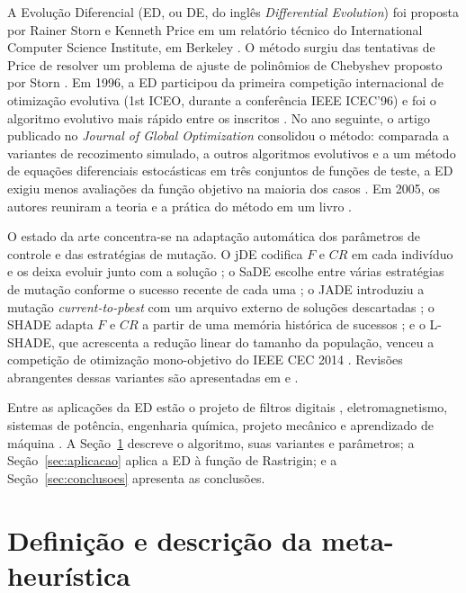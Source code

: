 \documentclass[12pt]{article}
\begin{document}
A Evolução Diferencial (ED, ou DE, do inglês \emph{Differential Evolution}) foi
proposta por Rainer Storn e Kenneth Price em um relatório técnico do
International Computer Science Institute, em Berkeley \cite{storn1995}. O
método surgiu das tentativas de Price de resolver um problema de ajuste de
polinômios de Chebyshev proposto por Storn \cite{das2011}. Em 1996, a ED
participou da primeira competição internacional de otimização evolutiva
(1st ICEO, durante a conferência IEEE ICEC'96) e foi o algoritmo evolutivo mais
rápido entre os inscritos
\cite{price1996iceo}. No ano seguinte, o artigo publicado no
\emph{Journal of Global Optimization} consolidou o método: comparada a
variantes de recozimento simulado, a outros algoritmos evolutivos e a um método
de equações diferenciais estocásticas em três conjuntos de funções de teste, a
ED exigiu menos avaliações da função objetivo na maioria dos casos
\cite{storn1997}. Em 2005, os autores reuniram a teoria e a prática do método
em um livro \cite{price2005}.

O estado da arte concentra-se na adaptação automática dos parâmetros de
controle e das estratégias de mutação. O jDE codifica $F$ e $CR$ em cada
indivíduo e os deixa evoluir junto com a solução \cite{brest2006}; o SaDE
escolhe entre várias estratégias de mutação conforme o sucesso recente de cada
uma \cite{qin2009}; o JADE introduziu a mutação \emph{current-to-pbest} com um
arquivo externo de soluções descartadas \cite{zhang2009}; o SHADE adapta $F$ e
$CR$ a partir de uma memória histórica de sucessos \cite{tanabe2013}; e o
L-SHADE, que acrescenta a redução linear do tamanho da população, venceu a
competição de otimização mono-objetivo do IEEE CEC 2014 \cite{tanabe2014}.
Revisões abrangentes dessas variantes são apresentadas em
\cite{das2011} e \cite{das2016}.

Entre as aplicações da ED estão o projeto de filtros digitais
\cite{storn1996iir}, eletromagnetismo, sistemas de potência, engenharia
química, projeto mecânico e aprendizado de máquina
\cite{das2011,das2016,cornell}. A Seção~\ref{sec:definicao} descreve o
algoritmo, suas variantes e parâmetros; a Seção~\ref{sec:aplicacao} aplica a
ED à função de Rastrigin; e a Seção~\ref{sec:conclusoes} apresenta as
conclusões.

\section{Definição e descrição da meta-heurística}\label{sec:definicao}
\end{document}
